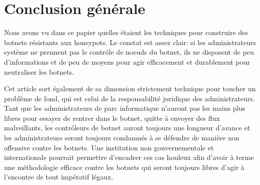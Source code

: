 \section*{Conclusion générale}

Nous avons vu dans ce papier quelles étaient les techniques pour construire
des botnets résistants aux honeypots. Le constat est assez clair: si
les administrateurs système ne prennent pas le contrôle de noeuds du botnet,
ils ne disposent de peu d'informations et de peu de moyens pour agir efficacement
et durablement pour neutraliser les botnets.

Cet article sort également de sa dimension strictement technique pour toucher
un problème de fond, qui est celui de la responsabilité juridique des
administrateurs. Tant que les administrateurs de parc informatique n'auront pas
les mains plus libres pour essayer de rentrer dans le botnet, quitte à envoyer
des flux malveillants, les contrôleurs de botnet auront toujours une longueur
d'avance et les administrateurs seront toujours condamnés à se défendre de manière
non offensive contre les botnets. Une institution non gouvernementale et
internationale pourrait permettre d'encadrer ces cas houleux afin d'avoir à
terme une méthodologie efficace contre les botnets qui seront toujours libres
d'agir à l'encontre de tout impératif légaux.
